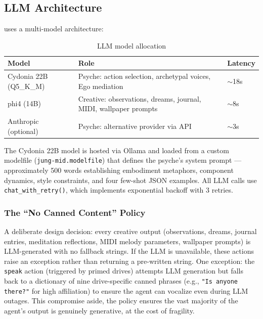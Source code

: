 \documentclass[11pt,oneside]{article}
\begin{document}
\subsection{LLM Architecture}
\label{sec:llm}

\jungagent{} uses a multi-model architecture:

\begin{table}[H]
\centering
\caption{LLM model allocation}
\label{tab:models}
\small
\begin{tabular}{l l l}
\toprule
\textbf{Model} & \textbf{Role} & \textbf{Latency} \\
\midrule
Cydonia 22B (Q5\_K\_M)     & Psyche: action selection, archetypal voices, Ego mediation & $\sim$18s \\
phi4 (14B)                & Creative: observations, dreams, journal, MIDI, wallpaper prompts & $\sim$8s \\
Anthropic (optional)      & Psyche: alternative provider via API & $\sim$3s \\
\bottomrule
\end{tabular}
\end{table}

The Cydonia 22B model is hosted via Ollama and loaded from a custom modelfile (\texttt{jung-mid.modelfile}) that defines the psyche's system prompt --- approximately 500 words establishing embodiment metaphors, component dynamics, style constraints, and four few-shot JSON examples.
All LLM calls use \texttt{chat\_with\_retry()}, which implements exponential backoff with 3 retries.

\subsubsection{The ``No Canned Content'' Policy}

A deliberate design decision: every creative output (observations, dreams, journal entries, meditation reflections, MIDI melody parameters, wallpaper prompts) is LLM-generated with no fallback strings.
If the LLM is unavailable, these actions raise an exception rather than returning a pre-written string.
One exception: the \texttt{speak} action (triggered by primed drives) attempts LLM generation but falls back to a dictionary of nine drive-specific canned phrases (e.g., \texttt{"Is anyone there?"} for high affiliation) to ensure the agent can vocalize even during LLM outages.
This compromise aside, the policy ensures the vast majority of the agent's output is genuinely generative, at the cost of fragility.
\end{document}

